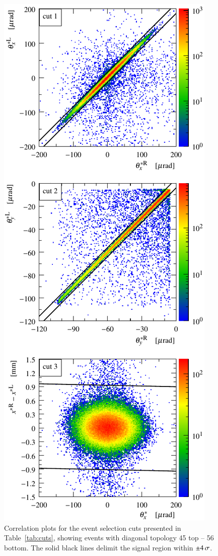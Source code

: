 \begin{figure}
\begin{center}
\includegraphics{fig/cuts.pdf}
\caption{%
Correlation plots for the event selection cuts presented in Table~\ref{tab:cuts}, showing events with diagonal topology 45 top -- 56 bottom. The solid black lines delimit the signal region within $\pm 4\,{\rm \sigma}$.
}
\label{fig:cuts}
\end{center}
\end{figure}

